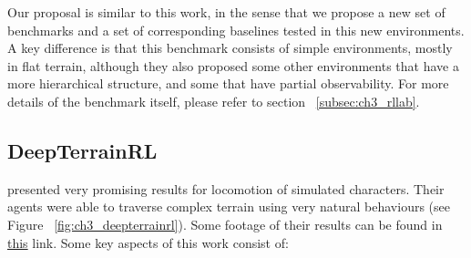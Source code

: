 Our proposal is similar to this work, in the sense that we propose a new set of
benchmarks and a set of corresponding baselines tested in this new environments.
A key difference is that this benchmark consists of simple environments, mostly
in flat terrain, although they also proposed some other environments that have a
more hierarchical structure, and some that have partial observability. For more
details of the benchmark itself, please refer to section ~\ref{subsec:ch3_rllab}.

\subsection{DeepTerrainRL}

\cite{DeepTerrainRL} presented very promising results for locomotion of simulated
characters. Their agents were able to traverse complex terrain using very natural
behaviours (see Figure ~\ref{fig:ch3_deepterrainrl}). Some footage of their results
can be found in \href{https://xbpeng.github.io/projects/DeepTerrainRL/}{this} link.
Some key aspects of this work consist of:

\figDeepTerrainRL
\figDeepTerrainRLcharacterFeatures
\figDeepTerrainRLMACE


